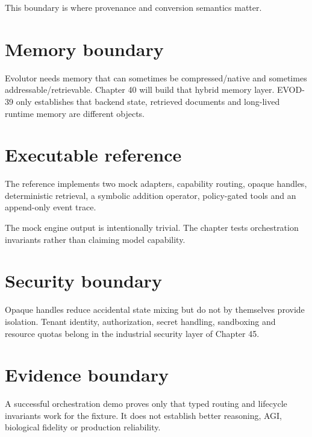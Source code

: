 This boundary is where provenance and conversion semantics matter.

\section{Memory boundary}
Evolutor needs memory that can sometimes be compressed/native and sometimes addressable/retrievable. Chapter 40 will build that hybrid memory layer. EVOD-39 only establishes that backend state, retrieved documents and long-lived runtime memory are different objects.

\section{Executable reference}
The reference implements two mock adapters, capability routing, opaque handles, deterministic retrieval, a symbolic addition operator, policy-gated tools and an append-only event trace.

The mock engine output is intentionally trivial. The chapter tests orchestration invariants rather than claiming model capability.

\section{Security boundary}
Opaque handles reduce accidental state mixing but do not by themselves provide isolation. Tenant identity, authorization, secret handling, sandboxing and resource quotas belong in the industrial security layer of Chapter 45.

\section{Evidence boundary}
A successful orchestration demo proves only that typed routing and lifecycle invariants work for the fixture. It does not establish better reasoning, AGI, biological fidelity or production reliability.

